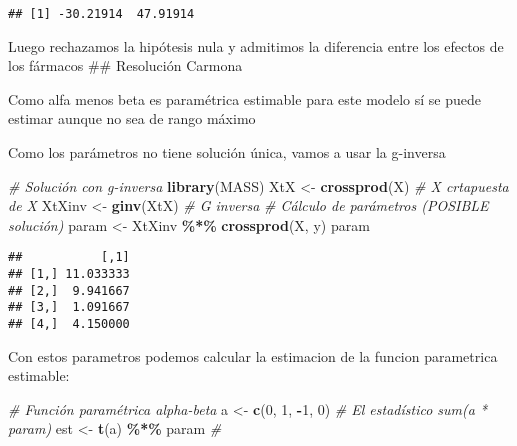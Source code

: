 \documentclass[
]{article}
\newenvironment{Shaded}{\begin{snugshade}}{\end{snugshade}}
\newcommand{\AttributeTok}[1]{\textcolor[rgb]{0.13,0.29,0.53}{#1}}
\newcommand{\CommentTok}[1]{\textcolor[rgb]{0.56,0.35,0.01}{\textit{#1}}}
\newcommand{\DecValTok}[1]{\textcolor[rgb]{0.00,0.00,0.81}{#1}}
\newcommand{\FunctionTok}[1]{\textcolor[rgb]{0.13,0.29,0.53}{\textbf{#1}}}
\newcommand{\NormalTok}[1]{#1}
\newcommand{\OtherTok}[1]{\textcolor[rgb]{0.56,0.35,0.01}{#1}}
\newcommand{\SpecialCharTok}[1]{\textcolor[rgb]{0.81,0.36,0.00}{\textbf{#1}}}
\begin{document}
\begin{verbatim}
## [1] -30.21914  47.91914
\end{verbatim}

Luego rechazamos la hipótesis nula y admitimos la diferencia entre los
efectos de los fármacos \#\# Resolución Carmona

Como alfa menos beta es paramétrica estimable para este modelo sí se
puede estimar aunque no sea de rango máximo

\begin{Shaded}
\end{Shaded}

Como los parámetros no tiene solución única, vamos a usar la g-inversa

\begin{Shaded}
\begin{Highlighting}[]
\CommentTok{\# Solución con g{-}inversa}
\FunctionTok{library}\NormalTok{(MASS)}
\NormalTok{XtX }\OtherTok{\textless{}{-}} \FunctionTok{crossprod}\NormalTok{(X) }\CommentTok{\# X crtapuesta de X}
\NormalTok{XtXinv }\OtherTok{\textless{}{-}} \FunctionTok{ginv}\NormalTok{(XtX) }\CommentTok{\# G inversa}
\CommentTok{\# Cálculo de parámetros (POSIBLE solución)}
\NormalTok{param }\OtherTok{\textless{}{-}}\NormalTok{ XtXinv }\SpecialCharTok{\%*\%} \FunctionTok{crossprod}\NormalTok{(X, y)}
\NormalTok{param}
\end{Highlighting}
\end{Shaded}

\begin{verbatim}
##           [,1]
## [1,] 11.033333
## [2,]  9.941667
## [3,]  1.091667
## [4,]  4.150000
\end{verbatim}

Con estos parametros podemos calcular la estimacion de la funcion
parametrica estimable:

\begin{Shaded}
\begin{Highlighting}[]
\CommentTok{\# Función paramétrica alpha{-}beta}
\NormalTok{a }\OtherTok{\textless{}{-}} \FunctionTok{c}\NormalTok{(}\DecValTok{0}\NormalTok{, }\DecValTok{1}\NormalTok{, }\SpecialCharTok{{-}}\DecValTok{1}\NormalTok{, }\DecValTok{0}\NormalTok{)}
\CommentTok{\# El estadístico sum(a * param)}
\NormalTok{est }\OtherTok{\textless{}{-}} \FunctionTok{t}\NormalTok{(a) }\SpecialCharTok{\%*\%}\NormalTok{ param }\CommentTok{\#}
\end{Highlighting}
\end{Shaded}
\end{document}

